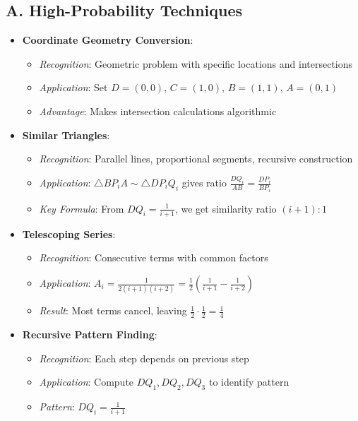 \documentclass[]{article}
\begin{document}
\begin{techniquesbox}
\subsection*{A. High-Probability Techniques}
\begin{itemize}[leftmargin=*]
    \item \textbf{Coordinate Geometry Conversion}: 
    \begin{itemize}
        \item \textit{Recognition}: Geometric problem with specific locations and intersections
        \item \textit{Application}: Set $D=(0,0)$, $C=(1,0)$, $B=(1,1)$, $A=(0,1)$
        \item \textit{Advantage}: Makes intersection calculations algorithmic
    \end{itemize}
    
    \item \textbf{Similar Triangles}:
    \begin{itemize}
        \item \textit{Recognition}: Parallel lines, proportional segments, recursive construction
        \item \textit{Application}: $\triangle BP_iA \sim \triangle DP_iQ_i$ gives ratio $\frac{DQ_i}{AB} = \frac{DP_i}{BP_i}$
        \item \textit{Key Formula}: From $DQ_i = \frac{1}{i+1}$, we get similarity ratio $(i+1):1$
    \end{itemize}
    
    \item \textbf{Telescoping Series}:
    \begin{itemize}
        \item \textit{Recognition}: Consecutive terms with common factors
        \item \textit{Application}: $A_i = \frac{1}{2(i+1)(i+2)} = \frac{1}{2}\left(\frac{1}{i+1} - \frac{1}{i+2}\right)$
        \item \textit{Result}: Most terms cancel, leaving $\frac{1}{2} \cdot \frac{1}{2} = \frac{1}{4}$
    \end{itemize}
    
    \item \textbf{Recursive Pattern Finding}:
    \begin{itemize}
        \item \textit{Recognition}: Each step depends on previous step
        \item \textit{Application}: Compute $DQ_1, DQ_2, DQ_3$ to identify pattern
        \item \textit{Pattern}: $DQ_i = \frac{1}{i+1}$
    \end{itemize}
\end{itemize}


\end{techniquesbox}
\end{document}
